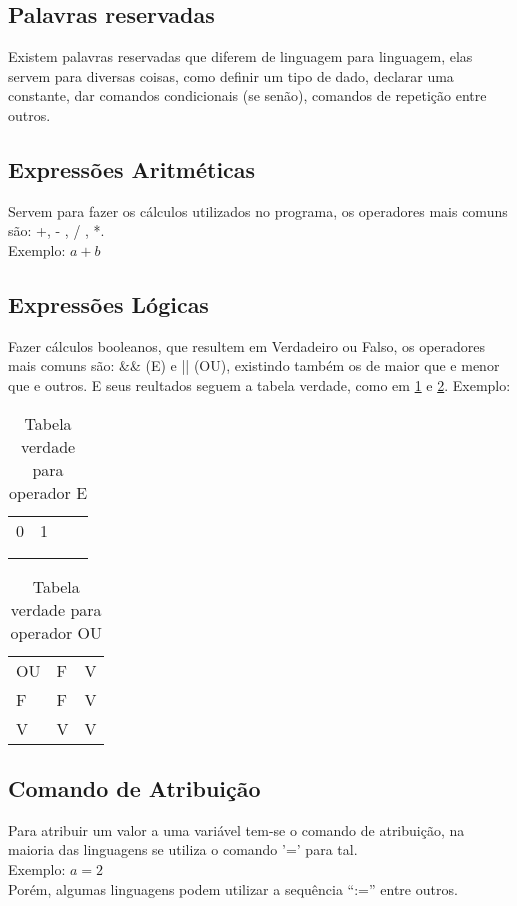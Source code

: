 \subsection{Palavras reservadas}
Existem palavras reservadas que diferem de linguagem para linguagem, elas servem para diversas coisas, como definir um tipo de dado, declarar uma constante, dar comandos condicionais (se senão), comandos de repetição entre outros.
\subsection{Expressões Aritméticas}
Servem para fazer os cálculos utilizados no programa, os operadores mais comuns são: +, - , / , *.\\ 
Exemplo: $ a + b $
\subsection{Expressões Lógicas}
Fazer cálculos booleanos, que resultem em Verdadeiro ou Falso, os operadores mais comuns são: \&\& (E) e || (OU), existindo também os de maior que e menor que e outros. E seus reultados seguem a tabela verdade, como em \ref{tab:vE} e \ref{tab:vOU}.
Exemplo: \\
\begin{table}[!h]
\centering
\caption{Tabela verdade para operador E}
\label{tab:vE}
\begin{tabular}{llll} \hline \hline
0 & 1 &  &  \\
&   &  &  \\
&   &  &  \\ \hline \hline
\end{tabular}
\end{table}

\begin{table}[!h]
\centering
\caption{Tabela verdade para operador OU}
\label{tab:vOU}
\begin{tabular}{lll}
OU & F & V \\
F  & F & V \\
V  & V & V
\end{tabular}
\end{table}
\subsection{Comando de Atribuição}
Para atribuir um valor a uma variável tem-se o comando de atribuição, na maioria das linguagens se utiliza o comando '=' para tal. \\
Exemplo: $ a = 2 $ \\
Porém, algumas linguagens podem utilizar a sequência ``:='' entre outros.
